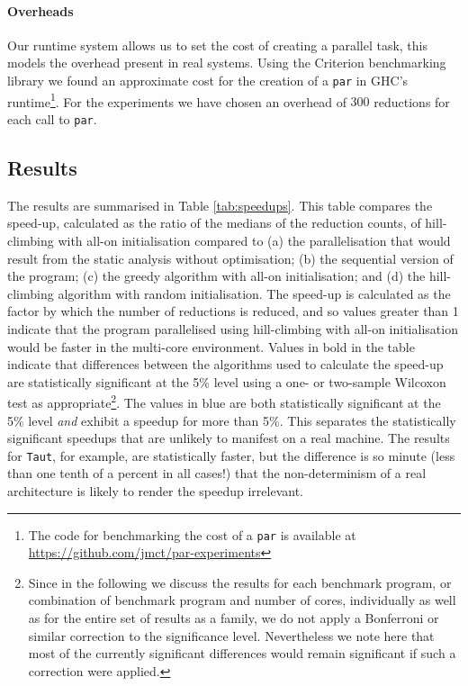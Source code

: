 \paragraph{Overheads} Our runtime system allows us to set the cost of creating
a parallel task, this models the overhead present in real systems. Using the
Criterion \citep{criterion} benchmarking library we found an approximate cost
for the creation of a \verb|par| in GHC's runtime\footnote{The code for
benchmarking the cost of a \texttt{par} is available at
\url{https://github.com/jmct/par-experiments}}. For the experiments we have
chosen an overhead of $300$ reductions for each call to \verb|par|.

\subsection{Results}

The results are summarised in Table \ref{tab:speedups}.  This table compares
the speed-up, calculated as the ratio of the medians of the reduction counts,
of hill-climbing with all-on initialisation compared to (a) the parallelisation
that would result from the static analysis without optimisation; (b) the
sequential version of the program; (c) the greedy algorithm with all-on
initialisation; and (d) the hill-climbing algorithm with random initialisation.
The speed-up is calculated as the factor by which the number of reductions is
reduced, and so values greater than 1 indicate that the program parallelised
using hill-climbing with all-on initialisation would be faster in the
multi-core environment.  Values in bold in the table indicate that differences
between the algorithms used to calculate the speed-up are statistically
significant at the 5\% level using a one- or two-sample Wilcoxon test as
appropriate\footnote{Since in the following we discuss the results for each
benchmark program, or combination of benchmark program and number of cores,
individually as well as for the entire set of results as a family, we do not
apply a Bonferroni or similar correction to the significance level.
Nevertheless we note here that most of the currently significant differences
would remain significant if such a correction were applied.}. The values in
blue are both statistically significant at the 5\% level \emph{and} exhibit a
speedup for more than 5\%. This separates the statistically significant
speedups that are unlikely to manifest on a real machine. The results for
\verb|Taut|, for example, are statistically faster, but the difference is so
minute (less than one tenth of a percent in all cases!) that the
non-determinism of a real architecture is likely to render the speedup
irrelevant.

